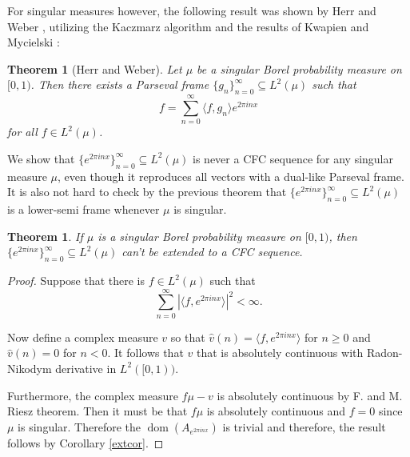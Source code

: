 \documentclass[11pt]{amsart}
\newtheorem{thm}{Theorem}[section]
\newtheorem*{thm*}{Theorem}
\theoremstyle{definition}
\numberwithin{equation}{section}
\begin{document}
For singular measures however, the following result was shown by Herr and Weber \cite{Herr2017Fourier}, utilizing the Kaczmarz algorithm and the results of Kwapien and Mycielski \cite{Kwapien2001Kaczmarz}:

\begin{thm*}[Herr and Weber]
Let $\mu$ be a singular Borel probability measure on $[0,1)$. Then there exists a Parseval frame $\{g_{n}\}_{n=0}^{\infty}\subseteq L^{2}(\mu)$ such that
$$f=\sum_{n=0}^{\infty}\langle f, g_{n}\rangle e^{2\pi i nx}$$ for all $f\in L^{2}(\mu)$.
\end{thm*}

We show that $\{e^{2\pi i nx}\}_{n=0}^{\infty}\subseteq L^{2}(\mu)$ is never a CFC sequence for any singular measure $\mu$, even though it reproduces all vectors with a dual-like Parseval frame. It is also not hard to check by the previous theorem that $\{e^{2\pi i nx}\}_{n=0}^{\infty}\subseteq L^{2}(\mu)$ is a lower-semi frame whenever $\mu$ is singular.

\begin{thm}
If $\mu$ is a singular Borel probability measure on $[0,1)$, then $\{e^{2\pi i nx}\}_{n=0}^{\infty}\subseteq L^{2}(\mu)$ can't be extended to a CFC sequence.
\end{thm}
\begin{proof}
Suppose that there is $f\in L^{2}(\mu)$ such that 
$$\sum_{n=0}^{\infty}|\langle f, e^{2\pi i nx}\rangle|^2<\infty.$$

Now define a complex measure $v$ so that 
$\hat{v}(n)=\langle f, e^{2\pi i nx}\rangle$ for $n\geq 0$ and 
$\hat{v}(n)=0$ for $n<0$. It follows that $v$ that is absolutely continuous with Radon-Nikodym derivative in $L^{2}([0,1))$.

Furthermore, the complex measure $f\mu -v$ is absolutely continuous by F. and M. Riesz theorem. Then it must be that $f\mu$ is absolutely continuous and $f=0$ since $\mu$ is singular. Therefore the $\operatorname{dom}(A_{e^{2\pi inx}})$ is trivial and therefore, the result follows by Corollary \ref{extcor}.
\end{proof}
\end{document}
